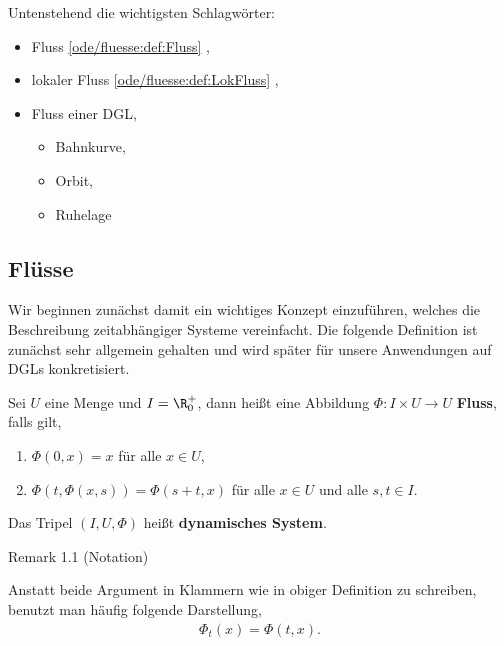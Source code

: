 \documentclass[letterpaper,10pt,english]{jupyterBook}
\begin{document}
Untenstehend die wichtigsten Schlagwörter:
\begin{itemize}
\item {} 
Fluss \cref{ode/fluesse:def:Fluss} ,

\item {} 
lokaler Fluss \cref{ode/fluesse:def:LokFluss} ,

\item {} 
Fluss einer DGL,
\begin{itemize}
\item {} 
Bahnkurve,

\item {} 
Orbit,

\item {} 
Ruhelage

\end{itemize}

\end{itemize}


\subsection{Flüsse}
\label{\detokenize{ode/fluesse:flusse}}
Wir beginnen zunächst damit ein wichtiges Konzept einzuführen, welches die Beschreibung zeitabhängiger Systeme vereinfacht. Die folgende Definition ist zunächst sehr allgemein gehalten und wird später für unsere Anwendungen auf DGLs konkretisiert.
\label{ode/fluesse:def:Fluss}
\begin{definition}{}{}



Sei \(U\) eine Menge und \(I=\R^+_0\), dann heißt eine Abbildung \(\Phi:I\times U\rightarrow U\) \textbf{Fluss}, falls gilt,
\begin{enumerate}

\item {} 
\(\Phi(0, x) = x\) für alle \(x\in U\),

\item {} 
\(\Phi(t, \Phi(x,s)) = \Phi(s + t, x)\) für alle \(x\in U\) und alle \(s,t\in I\).

\end{enumerate}

Das Tripel \((I, U, \Phi)\) heißt \textbf{dynamisches System}.
\end{definition}
\label{ode/fluesse:remark-1}
\begin{emphBox}{}{}{Remark 1.1 (Notation)}



Anstatt beide Argument in Klammern wie in obiger Definition zu schreiben, benutzt man häufig folgende Darstellung,
\begin{align*}
\Phi_t(x) = \Phi(t, x).
\end{align*}\end{emphBox}
\end{document}
